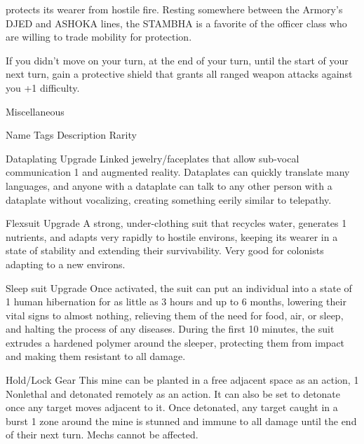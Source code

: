 protects its wearer from hostile fire. Resting somewhere between the Armory's DJED and ASHOKA lines,
the STAMBHA is a favorite of the officer class who are willing to trade mobility for protection.

If you didn't move on your turn, at the end of your turn, until the start of your next turn, gain a protective
shield that grants all ranged weapon attacks against you +1 difficulty.


                                                   Miscellaneous

  Name                Tags         Description                                                               Rarity

 Dataplating          Upgrade      Linked jewelry/faceplates that allow sub-vocal communication               1
                                   and augmented reality. Dataplates can quickly translate many
                                   languages, and anyone with a dataplate can talk to any other
                                   person with a dataplate without vocalizing, creating something
                                   eerily similar to telepathy.

 Flexsuit             Upgrade      A strong, under-clothing suit that recycles water, generates               1
                                   nutrients, and adapts very rapidly to hostile environs, keeping its
                                   wearer in a state of stability and extending their survivability. Very
                                   good for colonists adapting to a new environs.

 Sleep suit           Upgrade      Once activated, the suit can put an individual into a state of             1
                                   human hibernation for as little as 3 hours and up to 6 months,
                                   lowering their vital signs to almost nothing, relieving them of the
                                   need for food, air, or sleep, and halting the process of any
                                   diseases. During the first 10 minutes, the suit extrudes a
                                   hardened polymer around the sleeper, protecting them from
                                   impact and making them resistant to all damage.




 Hold/Lock          Gear        This mine can be planted in a free adjacent space as an action,      1
 Nonlethal                      and detonated remotely as an action. It can also be set to
                                detonate once any target moves adjacent to it. Once detonated,
                                any target caught in a burst 1 zone around the mine is stunned
                                and immune to all damage until the end of their next turn. Mechs
                                cannot be affected.

